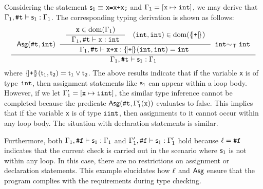 \documentclass[runningheads]{llncs}
\begin{document}
\begin{example}
\label{exp:typing_derivation}
Considering the statement $\mathsf{s}_1\equiv\;$\texttt{x=x+x;} and $\Gamma_1=[\texttt{x}\mapsto\mathtt{int}]$, we may derive that $\Gamma_1,\texttt{\#}\mathtt{t}\vdash\mathsf{s}_1:\Gamma_1$.
The corresponding typing derivation is shown as follows:
$$
{
\inference
{
    \assignable(\t,\typeInt)
    \enspace
    {
        \inference
        {
            {
            \inference
            {
                \texttt{x}\in\dom(\Gamma_1)
            }
            {
                \typing{\Gamma_1}{\t}{\texttt{x}}{\typeInt}
            }
            }
            \quad
            (\typeInt,\typeInt)\in\dom(\tmap{\texttt{+}}{})
        }
        {
            \typing{\Gamma_1}{\t}{\texttt{x+x}}{\tmap{\texttt{+}}{}(\typeInt,\typeInt)=\typeInt}\;
        }
    }
    \enspace
    \typeInt\comparable\typeInt
}
{
    \typing{\Gamma_1}{\t}{\s_1}{\Gamma_1}
}
}
$$
where $\{\!|\texttt{+}|\!\}_{}(\mathsf{t}_1,\mathsf{t}_2)=\mathsf{t}_1\lor \mathsf{t}_2$.
The above results indicate that if the variable \texttt{x} is of type $\mathtt{int}$, then assignment statements like $\mathsf{s}_1$ can appear within a loop body.
However, if we let $\Gamma_1'=[\texttt{x}\mapsto\mathtt{iint}]$, the similar type inference cannot be completed because the predicate $\mathsf{Asg}(\texttt{\#}\mathtt{t},\Gamma_1'(\texttt{x}))$ evaluates to false.
This implies that if the variable \texttt{x} is of type $\mathtt{iint}$, then assignments to it cannot occur within any loop body.
The situation with declaration statements is similar.

Furthermore, both $\Gamma_1,\texttt{\#}\mathtt{f}\vdash\mathsf{s}_1:\Gamma_1$ and $\Gamma_1',\texttt{\#}\mathtt{f}\vdash\mathsf{s}_1:\Gamma_1'$ hold because $\ell=\texttt{\#}\mathtt{f}$ indicates that the current check is carried out in the scenario where $\mathsf{s}_1$ is not within any loop.
In this case, there are no restrictions on assignment or declaration statements.
This example elucidates how $\ell$ and $\mathsf{Asg}$ ensure that the program complies with the requirements during type checking.
\end{example}
\end{document}
